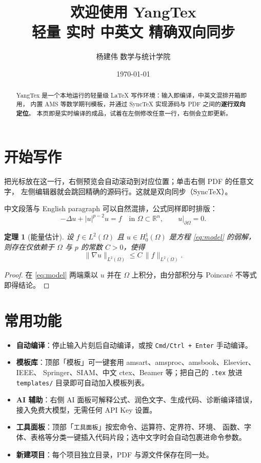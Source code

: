 \documentclass[11pt,a4paper,fontset=fandol]{ctexart}
\title{\textbf{欢迎使用 YangTex}\\[4pt]
       \large 轻量 \quad 实时 \quad 中英文 \quad 精确双向同步}
\author{杨建伟 \quad 数学与统计学院}
\date{\today}
\newtheorem{theorem}{定理}[section]
\newcommand{\R}{\mathbb{R}}
\newcommand{\Om}{\Omega}
\begin{document}
\maketitle

\begin{abstract}
\noindent YangTex 是一个本地运行的轻量级 \LaTeX{} 写作环境：输入即编译，中英文混排开箱即用，
内置 AMS 等数学期刊模板，并通过 SyncTeX 实现源码与 PDF 之间的\textbf{逐行双向定位}。
本页即是实时编译的成品，试着在左侧修改任意一行，右侧会立即更新。
\end{abstract}

\section{开始写作}

把光标放在这一行，右侧预览会自动滚动到对应位置；单击右侧 PDF 的任意文字，
左侧编辑器就会跳回精确的源码行。这就是双向同步（SyncTeX）。

中文段落与 English paragraph 可以自然混排，公式同样即时排版：
\begin{equation}\label{eq:model}
  -\Delta u + |u|^{p-2}u = f \quad \text{in } \Om\subset\R^n,
  \qquad u|_{\partial\Om}=0 .
\end{equation}

\begin{theorem}[能量估计]
设 $f\in L^2(\Om)$ 且 $u\in H^1_0(\Om)$ 是方程 \eqref{eq:model} 的弱解，
则存在仅依赖于 $\Om$ 与 $p$ 的常数 $C>0$，使得
\begin{equation}
  \|\nabla u\|_{L^2(\Om)} \le C\,\|f\|_{L^2(\Om)} .
\end{equation}
\end{theorem}

\begin{proof}
在 \eqref{eq:model} 两端乘以 $u$ 并在 $\Om$ 上积分，由分部积分与
Poincaré 不等式即得结论。
\end{proof}

\section{常用功能}
\begin{itemize}
  \item \textbf{自动编译}：停止输入片刻后自动编译，或按 \texttt{Cmd/Ctrl + Enter} 手动编译。
  \item \textbf{模板库}：顶部「模板」可一键套用 amsart、amsproc、amsbook、Elsevier、IEEE、
        Springer、SIAM、中文 ctex、Beamer 等；把自己的 \texttt{.tex} 放进 \texttt{templates/}
        目录即可自动加入模板列表。
  \item \textbf{AI 辅助}：右侧 AI 面板可解释公式、润色文字、生成代码、诊断编译错误，
        接入免费大模型，无需任何 API Key 设置。
  \item \textbf{工具面板}：顶部「\texttt{工具面板}」按宏命令、运算符、定界符、环境、
        函数、字体、表格等分类一键插入代码片段；选中文字时会自动包裹进命令参数。
  \item \textbf{新建项目}：每个项目独立目录，PDF 与源文件保存在同一处。
\end{itemize}
\end{document}
